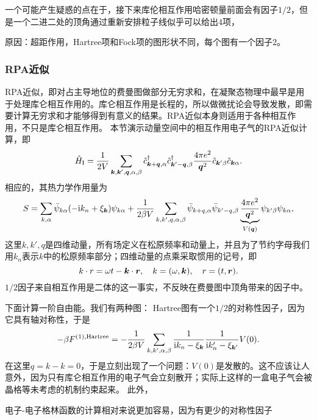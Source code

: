\documentclass[hyperref, UTF8, a4paper]{ctexart}
\newcommand*{\ii}{\mathrm{i}}
\begin{document}
一个可能产生疑惑的点在于，接下来库伦相互作用哈密顿量前面会有因子$1/2$，但是一个二进二处的顶角通过重新安排粒子线似乎可以给出$4$项，

原因：超距作用，Hartree项和Fock项的图形状不同，每个图有一个因子$2$。

\subsubsection{RPA近似}

RPA近似，即对占主导地位的费曼图做部分无穷求和，在凝聚态物理中最早是用于处理库仑相互作用的。库仑相互作用是长程的，所以做微扰论会导致发散，即需要计算无穷求和才能够得到有意义的结果。RPA近似本身则适用于各种相互作用，不只是库仑相互作用。
本节演示动量空间中的相互作用电子气的RPA近似计算，即
\begin{equation}
    \hat{H}_\text{I} = \frac{1}{2V} \sum_{\vb*{k}, \vb*{k}', \vb*{q}, \alpha, \beta} \hat{c}^\dagger_{\vb*{k}+\vb*{q}, \alpha} \hat{c}^\dagger_{\vb*{k}'-\vb*{q}, \beta} \frac{4\pi e^2}{\vb*{q}^2} \hat{c}_{\vb*{k}' \beta} \hat{c}_{\vb*{k} \alpha}.
\end{equation}
相应的，其热力学作用量为
\begin{equation}
    S = \sum_{k, \alpha} \bar{\psi}_{k \alpha} (-\ii k_n + \xi_{\vb*{k}}) \psi_{k \alpha} + \frac{1}{2 \beta V} \sum_{k, k', q, \alpha, \beta} \bar{\psi}_{k+q, \alpha} \bar{\psi}_{k'-q, \beta} \underbrace{\frac{4\pi e^2}{\vb*{q}^2}}_{V(\vb*{q})} \psi_{k' \beta} \psi_{k \alpha},
\end{equation}
这里$k, k', q$是四维动量，所有场定义在松原频率和动量上，并且为了节约字母我们用$k_n$表示$k$中的松原频率部分；四维动量的点乘采取惯用的记号，即
\begin{equation}
    k \cdot r = \omega t - \vb*{k} \cdot \vb*{r}, \quad k = (\omega, \vb*{k}), \quad r = (t, \vb*{r}).
\end{equation}
$1/2$因子来自相互作用是二体的这一事实，不反映在费曼图中顶角带来的因子中。

下面计算一阶自由能。我们有两种图：
Hartree图有一个$1/2$的对称性因子，因为它具有轴对称性，于是
\[
    - \beta F^{(1),\text{Hartree}} = - \frac{1}{2 \beta V} \sum_{k, k', \alpha, \beta} \frac{1}{\ii k_n - \xi_{\vb*{k}}} \frac{1}{\ii k'_n - \xi_{\vb*{k}'}} V(0) .
\]
在这里$q=k-k=0$，于是立刻出现了一个问题：$V(0)$是发散的。这不应该让人意外，因为只有库仑相互作用的电子气会立刻散开；实际上这样的一盒电子气会被晶格等未考虑的机制约束起来。
此外，

电子-电子格林函数的计算相对来说更加容易，因为有更少的对称性因子
\end{document}
